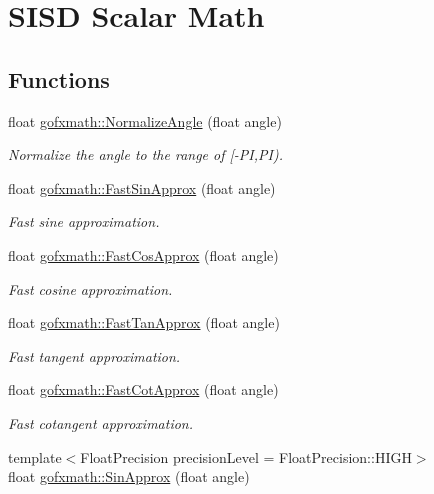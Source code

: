 \hypertarget{group___s_i_s_d_scalar_math}{}\section{S\+I\+S\+D Scalar Math}
\label{group___s_i_s_d_scalar_math}
\subsection*{Functions}
\begin{DoxyCompactItemize}
\item 
float \hyperlink{group___s_i_s_d_scalar_math_ga53debb59a36f436520d9f8696fb5af17}{gofxmath\+::\+Normalize\+Angle} (float angle)
\begin{DoxyCompactList}\small\item\em Normalize the angle to the range of \mbox{[}-\/\+P\+I,P\+I). \end{DoxyCompactList}\item 
float \hyperlink{group___s_i_s_d_scalar_math_gacda965689f172d535fcea8ca52a28358}{gofxmath\+::\+Fast\+Sin\+Approx} (float angle)
\begin{DoxyCompactList}\small\item\em Fast sine approximation. \end{DoxyCompactList}\item 
float \hyperlink{group___s_i_s_d_scalar_math_ga225f52235ddb3aac0be7405e966df40e}{gofxmath\+::\+Fast\+Cos\+Approx} (float angle)
\begin{DoxyCompactList}\small\item\em Fast cosine approximation. \end{DoxyCompactList}\item 
float \hyperlink{group___s_i_s_d_scalar_math_ga29cc2127c4bb018c147006a618baf5f3}{gofxmath\+::\+Fast\+Tan\+Approx} (float angle)
\begin{DoxyCompactList}\small\item\em Fast tangent approximation. \end{DoxyCompactList}\item 
float \hyperlink{group___s_i_s_d_scalar_math_gabd664af8218cb91dc9b74786a054f45a}{gofxmath\+::\+Fast\+Cot\+Approx} (float angle)
\begin{DoxyCompactList}\small\item\em Fast cotangent approximation. \end{DoxyCompactList}\item 
{\footnotesize template$<$Float\+Precision precision\+Level = Float\+Precision\+::\+H\+I\+G\+H$>$ }\\float \hyperlink{group___s_i_s_d_scalar_math_gaece3a06431141a5c010de32ea23bedcf}{gofxmath\+::\+Sin\+Approx} (float angle)

\end{DoxyCompactItemize}
